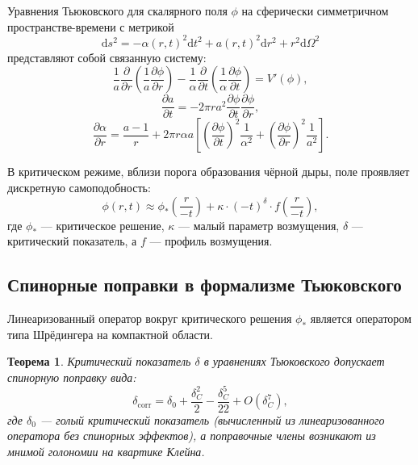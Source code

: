 \documentclass[12pt,a4paper]{article}
\newtheorem{theorem}{Теорема}[section]
\theoremstyle{definition}
\theoremstyle{remark}
\newcommand{\dd}{\mathrm{d}}
\begin{document}
Уравнения Тьюковского для скалярного поля $\phi$ на сферически симметричном пространстве-времени с метрикой
\begin{equation}
\dd s^2 = -\alpha(r, t)^2 \dd t^2 + a(r, t)^2 \dd r^2 + r^2 \dd\Omega^2
\end{equation}
представляют собой связанную систему:
\begin{equation}
\label{eq:tyukovsky-1-ru}
\frac{1}{a} \frac{\partial}{\partial r}\left(\frac{1}{a} \frac{\partial \phi}{\partial r}\right) - \frac{1}{\alpha} \frac{\partial}{\partial t}\left(\frac{1}{\alpha} \frac{\partial \phi}{\partial t}\right) = V'(\phi),
\end{equation}
\begin{equation}
\label{eq:tyukovsky-2-ru}
\frac{\partial a}{\partial t} = -2\pi r a^2 \frac{\partial\phi}{\partial t} \frac{\partial\phi}{\partial r},
\end{equation}
\begin{equation}
\label{eq:tyukovsky-3-ru}
\frac{\partial \alpha}{\partial r} = \frac{a - 1}{r} + 2\pi r \alpha a \left[\left(\frac{\partial\phi}{\partial t}\right)^2 \frac{1}{\alpha^2} + \left(\frac{\partial\phi}{\partial r}\right)^2 \frac{1}{a^2}\right].
\end{equation}

В критическом режиме, вблизи порога образования чёрной дыры, поле проявляет дискретную самоподобность:
\begin{equation}
\phi(r, t) \approx \phi_*\left(\frac{r}{-t}\right) + \kappa \cdot (-t)^\delta \cdot f\left(\frac{r}{-t}\right),
\end{equation}
где $\phi_*$ --- критическое решение, $\kappa$ --- малый параметр возмущения, $\delta$ --- критический показатель, а $f$ --- профиль возмущения.

\subsection{Спинорные поправки в формализме Тьюковского}

Линеаризованный оператор вокруг критического решения $\phi_*$ является оператором типа Шрёдингера на компактной области.

\begin{theorem}
\label{thm:tyukovsky-correction-ru}
Критический показатель $\delta$ в уравнениях Тьюковского допускает спинорную поправку вида:
\begin{equation}
\delta_{\mathrm{corr}} = \delta_0 + \frac{\delta_C^2}{2} - \frac{\delta_C^5}{22} + O(\delta_C^7),
\end{equation}
где $\delta_0$ --- голый критический показатель (вычисленный из линеаризованного оператора без спинорных эффектов), а поправочные члены возникают из мнимой голономии на квартике Клейна.
\end{theorem}
\end{document}
